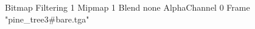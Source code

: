 {Bitmap
	{Filtering 1}
	{Mipmap 1}
	{Blend none}
	{AlphaChannel 0}
	{Frame "pine_tree3#bare.tga"}
}
